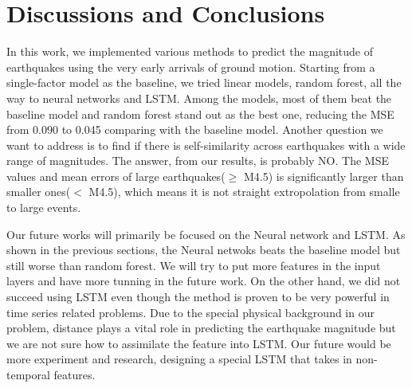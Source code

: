 \documentclass{article} %
\begin{document}
\section{Discussions and Conclusions}

In this work, we implemented various methods to predict the magnitude of earthquakes using the very early arrivals of ground motion. Starting from a single-factor model as the baseline, we tried linear models, random forest, all the way to neural networks and LSTM. Among the models, most of them beat the baseline model and random forest stand out as the best one, reducing the MSE from 0.090 to 0.045 comparing with the baseline model. Another question we want to address is to find if there is self-similarity across earthquakes with a wide range of magnitudes. The answer, from our results, is probably NO. The MSE values and mean errors of large earthquakes($\geq $ M4.5) is significantly larger than smaller ones($< $ M4.5), which means it is not straight extropolation from smalle to large events.

Our future works will primarily be focused on the Neural network and LSTM. As shown in the previous sections, the Neural netwoks beats the baseline model but still worse than random forest. We will try to put more features in the input layers and have more tunning in the future work. On the other hand, we did not succeed using LSTM even though the method is proven to be very powerful in time series related problems. Due to the special physical background in our problem, distance plays a vital role in predicting the earthquake magnitude but we are not sure how to assimilate the feature into LSTM. Our future would be more experiment and research, designing a special LSTM that takes in non-temporal features.

\end{document}
